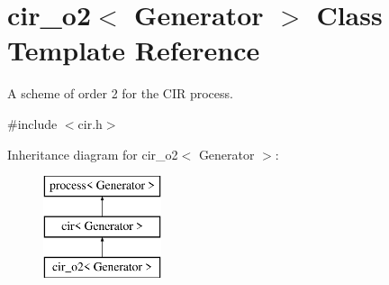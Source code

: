 \hypertarget{classcir__o2}{}\section{cir\+\_\+o2$<$ Generator $>$ Class Template Reference}
\label{classcir__o2}


A scheme of order 2 for the C\+IR process.  




{\ttfamily \#include $<$cir.\+h$>$}

Inheritance diagram for cir\+\_\+o2$<$ Generator $>$\+:\begin{figure}[H]
\begin{center}
\leavevmode
\includegraphics[height=3.000000cm]{classcir__o2}
\end{center}
\end{figure}
